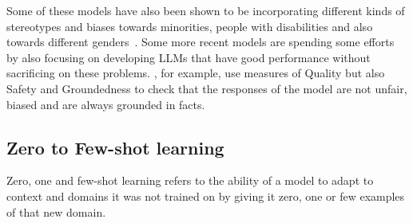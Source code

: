 \documentclass[nomenclature, english, biblatex]{kththesis}
\begin{document}

Some of these models have also been shown to be incorporating different kinds of stereotypes and biases towards minorities, people with disabilities and also towards different genders~\cite{hutchinson2020social, basta2019evaluating, kurita2019measuring, sheng2019woman}. Some more recent models are spending some efforts by also focusing on developing \glspl{LLM} that have good performance without sacrificing on these problems. \textcite{thoppilan2022lamda}, for example, use measures of Quality but also Safety and Groundedness to check that the responses of the model are not unfair, biased and are always grounded in facts.
\subsection{Zero to Few-shot learning}
Zero, one and few-shot learning refers to the ability of a model to adapt to context and domains it was not trained on by giving it zero, one or few examples of that new domain.
\end{document}
